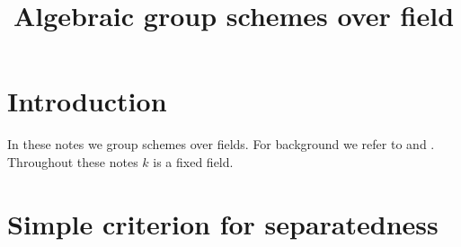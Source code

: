 



\title{Algebraic group schemes over field}
\date{}
\maketitle

\section{Introduction}
\noindent
In these notes we group schemes over fields. For background we refer to \cite{kfunctors} and \cite{Monoid_k_functors}.\\
Throughout these notes $k$ is a fixed field.



\section{Simple criterion for separatedness}


